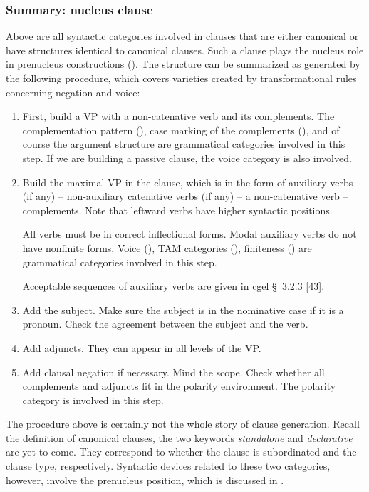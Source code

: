 \documentclass{article}
\newcommand*{\citesec}[1]{\S~{#1}}
\newcommand*{\term}[1]{\emph{#1}}
\begin{document}
\subsubsection{Summary: nucleus clause}\label{sec:summary-nucleus}

Above are all syntactic categories involved in clauses 
that are either canonical or have structures identical to canonical clauses.
Such a clause plays the nucleus role in prenucleus constructions ().
The structure can be summarized as generated by the following procedure,
which covers varieties created by transformational rules concerning 
negation and voice:
\begin{enumerate}
    \item First, build a VP with a non-catenative verb and its complements.
    The complementation pattern (),
    case marking of the complements (),
    and of course the argument structure 
    are grammatical categories involved in this step.
    If we are building a passive clause, 
    the voice category is also involved.
    \item Build the maximal VP in the clause, which is in the form of 
    auxiliary verbs (if any) -- 
    non-auxiliary catenative verbs (if any) --
    a non-catenative verb -- complements.
    Note that leftward verbs have higher syntactic positions.

    All verbs must be in correct inflectional forms.
    Modal auxiliary verbs do not have nonfinite forms.
    Voice (), TAM categories (),
    finiteness ()
    are grammatical categories involved in this step.
    
    Acceptable sequences of auxiliary verbs are given in \ac{cgel} \citesec{3.2.3} [43].
    \item Add the subject. Make sure the subject is in the nominative case if it is a pronoun.
    Check the agreement between the subject and the verb.
    \item Add adjuncts. They can appear in all levels of the VP.
    \item Add clausal negation if necessary.
    Mind the scope.
    Check whether all complements and adjuncts fit in the polarity environment.
    The polarity category is involved in this step.
\end{enumerate}

The procedure above is certainly not the whole story of clause generation.
Recall the definition of canonical clauses,
the two keywords \term{standalone} and \term{declarative} are yet to come. 
They correspond to whether the clause is subordinated and the clause type, respectively.
Syntactic devices related to these two categories, however,
involve the prenucleus position, which is discussed in .
\end{document}
